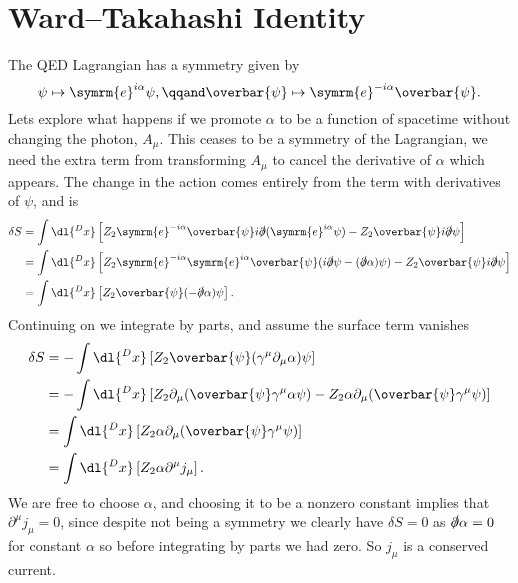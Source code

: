 \documentclass[fleqn]{NotesClass}
\newcommand{\e}{\symrm{e}}
\newcommand{\diracadjoint}[1]{\overbar{#1}}
\begin{document}
    \section{Ward--Takahashi Identity}
    The QED Lagrangian has a symmetry given by
    \begin{equation}
        \psi \mapsto \e^{i\alpha}\psi, \qqand \diracadjoint{\psi} \mapsto \e^{-i\alpha}\diracadjoint{\psi}.
    \end{equation}
    Lets explore what happens if we promote \(\alpha\) to be a function of spacetime without changing the photon, \(A_\mu\).
    This ceases to be a symmetry of the Lagrangian, we need the extra term from transforming \(A_\mu\) to cancel the derivative of \(\alpha\) which appears.
    The change in the action comes entirely from the term with derivatives of \(\psi\), and is
    \begin{align}
        \delta S &= \int \dl{^Dx} \left[ Z_2 \e^{-i\alpha}\diracadjoint{\psi}i\slashed{\partial}(\e^{i\alpha}\psi) - Z_2 \diracadjoint{\psi}i\slashed{\partial}\psi \right]\\
        &= \int \dl{^Dx} \left[ Z_2 \e^{-i\alpha}\e^{i\alpha}\diracadjoint{\psi}(i\slashed{\partial}\psi - (\slashed{\partial}\alpha)\psi) - Z_2\diracadjoint{\psi}i\slashed{\partial}\psi \right]\\
        &= \int \dl{^Dx}\left[ Z_2 \diracadjoint{\psi}(-\slashed{\partial}\alpha) \psi \right].
    \end{align}
    Continuing on we integrate by parts, and assume the surface term vanishes
    \begin{align}
        \delta S &= -\int \dl{^Dx} \left[ Z_2 \diracadjoint{\psi}(\gamma^\mu \partial_\mu \alpha)\psi \right]\\
        &= -\int \dl{^Dx} \left[ Z_2 \partial_\mu (\diracadjoint{\psi}\gamma^\mu \alpha \psi) - Z_2 \alpha \partial_\mu (\diracadjoint{\psi} \gamma^\mu \psi) \right]\\
        &= \int \dl{^Dx} \left[ Z_2 \alpha \partial_\mu (\diracadjoint{\psi} \gamma^\mu \psi) \right]\\
        &= \int \dl{^Dx} \left[ Z_2 \alpha \partial^\mu j_\mu \right].
    \end{align}
    We are free to choose \(\alpha\), and choosing it to be a nonzero constant implies that \(\partial^\mu j_\mu = 0\), since despite not being a symmetry we clearly have \(\delta S = 0\) as \(\slashed{\partial} \alpha = 0\) for constant \(\alpha\) so before integrating by parts we had zero.
    So \(j_\mu\) is a conserved current.
    
\end{document}
